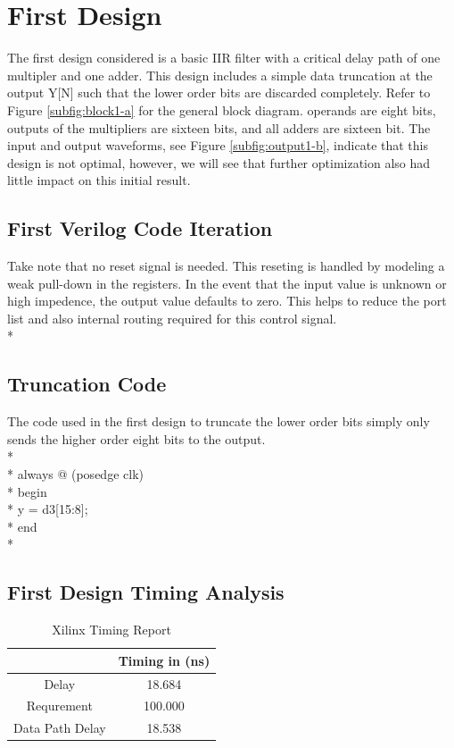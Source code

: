
\section*{First Design}
The first design considered is a basic IIR filter with a critical delay path of one multipler and one adder. This design includes a simple data truncation at the output Y[N] such that the lower order bits are discarded completely. Refer to Figure \ref{subfig:block1-a} for the general block diagram. operands are eight bits, outputs of the multipliers are sixteen bits, and all adders are sixteen bit. The input and output waveforms, see Figure \ref{subfig:output1-b}, indicate that this design is not optimal, however, we will see that further optimization also had little impact on this initial result.

\subsection*{First Verilog Code Iteration}
Take note that no reset signal is needed. This reseting is handled by modeling a weak pull-down in the registers. In the event that the input value is unknown or high impedence, the output value defaults to zero. This helps to reduce the port list and also internal routing required for this control signal. 
\\*
\lstset{language=verilog}

\subsection*{Truncation Code}
The code used in the first design to truncate the lower order bits simply only sends the higher order eight bits to the output.\\*
\\*
always @ (posedge clk)\\*
begin	\\*
y = d3[15:8];\\*
end\\*

\subsection*{First Design Timing Analysis}

\begin{table}[bh]
\caption{Xilinx Timing Report}
\begin{tabular}{c|c}
\centering
           & Timing in (ns) \\
\hline
     Delay &     18.684 \\

Requrement &        100.000 \\

Data Path Delay &     18.538 \\
\end{tabular}  
\label{tab:timing1}
\end{table}


